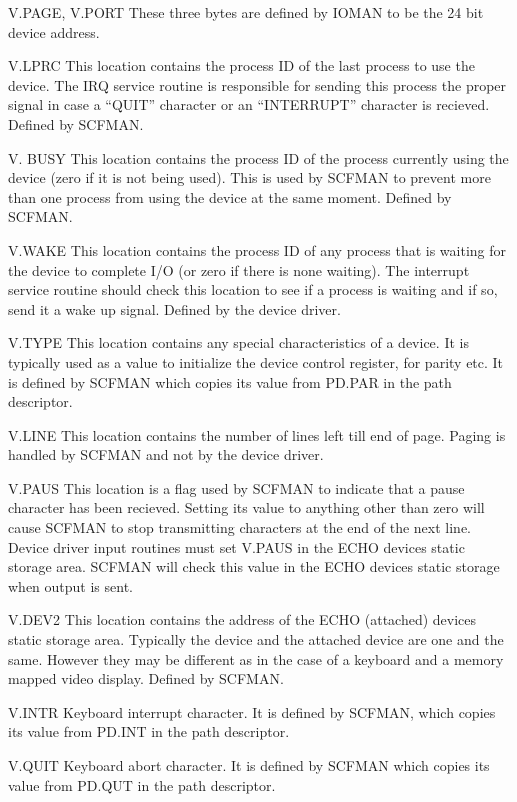 \documentclass[
]{article}
\newcounter{none} %
\begin{document}
V.PAGE, V.PORT These three bytes are defined by IOMAN to be the 24 bit
device address.

V.LPRC This location contains the process ID of the last process to use
the device. The IRQ service routine is responsible for sending this
process the proper signal in case a ``QUIT'' character or an
``INTERRUPT'' character is recieved. Defined by SCFMAN.

V. BUSY This location contains the process ID of the process currently
using the device (zero if it is not being used). This is used by SCFMAN
to prevent more than one process from using the device at the same
moment. Defined by SCFMAN.

V.WAKE This location contains the process ID of any process that is
waiting for the device to complete I/O (or zero if there is none
waiting). The interrupt service routine should check this location to
see if a process is waiting and if so, send it a wake up signal. Defined
by the device driver.

V.TYPE This location contains any special characteristics of a device.
It is typically used as a value to initialize the device control
register, for parity etc. It is defined by SCFMAN which copies its value
from PD.PAR in the path descriptor.

V.LINE This location contains the number of lines left till end of page.
Paging is handled by SCFMAN and not by the device driver.

V.PAUS This location is a flag used by SCFMAN to indicate that a pause
character has been recieved. Setting its value to anything other than
zero will cause SCFMAN to stop transmitting characters at the end of the
next line. Device driver input routines must set V.PAUS in the ECHO
device\textquotesingle s static storage area. SCFMAN will check this
value in the ECHO device\textquotesingle s static storage when output is
sent.

V.DEV2 This location contains the address of the ECHO (attached)
device\textquotesingle s static storage area. Typically the device and
the attached device are one and the same. However they may be different
as in the case of a keyboard and a memory mapped video display. Defined
by SCFMAN.

V.INTR Keyboard interrupt character. It is defined by SCFMAN, which
copies its value from PD.INT in the path descriptor.

V.QUIT Keyboard abort character. It is defined by SCFMAN which copies
its value from PD.QUT in the path descriptor.
\end{document}
